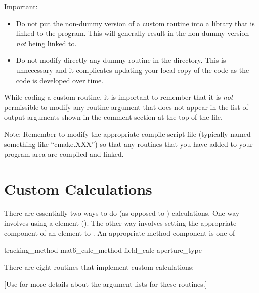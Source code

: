 Important: 
\begin{itemize}
\item
Do not put the non-dummy version of a custom routine into a library that is linked to the
program. This will generally result in the non-dummy version {\em not} being linked to.
\item
Do not modify directly any dummy routine in the  directory. This is unnecessary
and it complicates updating your local copy of the \bmad code as the \bmad code is
developed over time.
\end{itemize}

While coding a custom routine, it is important to remember that it is {\em not} permissible to
modify any routine argument that does not appear in the list of output arguments shown in the
comment section at the top of the file.

Note: Remember to modify the appropriate compile script file (typically named something like
``cmake.XXX'') so that any routines that you have added to your program area are compiled and
linked.

\section{Custom Calculations}
\label{s:custom.ele}

There are essentially two ways to do  (as opposed to ) calculations. One way
involves using a  element (). The other way involves setting the
appropriate  component of an element to . An appropriate method component is
one of
\begin{example}
  tracking_method       
  mat6_calc_method      
  field_calc            
  aperture_type         
\end{example}

There are eight routines that implement custom calculations:
\begin{example}
\end{example}
[Use  for more details about the argument lists for these
routines.]  


